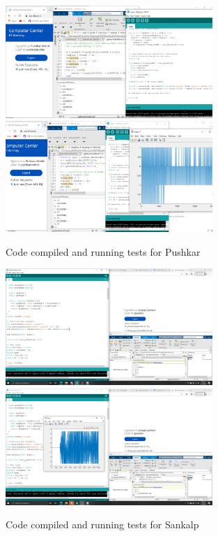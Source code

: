 \begin{figure}[ht]
    \centering
    \includegraphics[width=0.7\textwidth]{fig/pushkcompile1.png}
    \includegraphics[width=0.7\textwidth]{fig/pushkcompile2.png}
    \caption{Code compiled and running tests for Pushkar}
    \label{fig:pushkcompile}
\end{figure}
\begin{figure}[ht]
    \centering
    \includegraphics[width=0.7\textwidth]{fig/sankacompile1.png}
    \includegraphics[width=0.7\textwidth]{fig/sankacompile2.png}
    \caption{Code compiled and running tests for Sankalp}
    \label{fig:sankacompile}
\end{figure}

